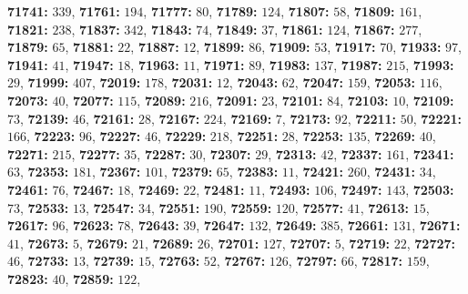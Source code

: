 \textsf{\bfseries 71741:} $339$, \textsf{\bfseries 71761:} $194$, \textsf{\bfseries 71777:} $80$, \textsf{\bfseries 71789:} $124$, \textsf{\bfseries 71807:} $58$, \textsf{\bfseries 71809:} $161$, \textsf{\bfseries 71821:} $238$, \textsf{\bfseries 71837:} $342$, \textsf{\bfseries 71843:} $74$, \textsf{\bfseries 71849:} $37$, \textsf{\bfseries 71861:} $124$, \textsf{\bfseries 71867:} $277$, \textsf{\bfseries 71879:} $65$, \textsf{\bfseries 71881:} $22$, \textsf{\bfseries 71887:} $12$, \textsf{\bfseries 71899:} $86$, \textsf{\bfseries 71909:} $53$, \textsf{\bfseries 71917:} $70$, \textsf{\bfseries 71933:} $97$, \textsf{\bfseries 71941:} $41$, \textsf{\bfseries 71947:} $18$, \textsf{\bfseries 71963:} $11$, \textsf{\bfseries 71971:} $89$, \textsf{\bfseries 71983:} $137$, \textsf{\bfseries 71987:} $215$, \textsf{\bfseries 71993:} $29$, \textsf{\bfseries 71999:} $407$, \textsf{\bfseries 72019:} $178$, \textsf{\bfseries 72031:} $12$, \textsf{\bfseries 72043:} $62$, \textsf{\bfseries 72047:} $159$, \textsf{\bfseries 72053:} $116$, \textsf{\bfseries 72073:} $40$, \textsf{\bfseries 72077:} $115$, \textsf{\bfseries 72089:} $216$, \textsf{\bfseries 72091:} $23$, \textsf{\bfseries 72101:} $84$, \textsf{\bfseries 72103:} $10$, \textsf{\bfseries 72109:} $73$, \textsf{\bfseries 72139:} $46$, \textsf{\bfseries 72161:} $28$, \textsf{\bfseries 72167:} $224$, \textsf{\bfseries 72169:} $7$, \textsf{\bfseries 72173:} $92$, \textsf{\bfseries 72211:} $50$, \textsf{\bfseries 72221:} $166$, \textsf{\bfseries 72223:} $96$, \textsf{\bfseries 72227:} $46$, \textsf{\bfseries 72229:} $218$, \textsf{\bfseries 72251:} $28$, \textsf{\bfseries 72253:} $135$, \textsf{\bfseries 72269:} $40$, \textsf{\bfseries 72271:} $215$, \textsf{\bfseries 72277:} $35$, \textsf{\bfseries 72287:} $30$, \textsf{\bfseries 72307:} $29$, \textsf{\bfseries 72313:} $42$, \textsf{\bfseries 72337:} $161$, \textsf{\bfseries 72341:} $63$, \textsf{\bfseries 72353:} $181$, \textsf{\bfseries 72367:} $101$, \textsf{\bfseries 72379:} $65$, \textsf{\bfseries 72383:} $11$, \textsf{\bfseries 72421:} $260$, \textsf{\bfseries 72431:} $34$, \textsf{\bfseries 72461:} $76$, \textsf{\bfseries 72467:} $18$, \textsf{\bfseries 72469:} $22$, \textsf{\bfseries 72481:} $11$, \textsf{\bfseries 72493:} $106$, \textsf{\bfseries 72497:} $143$, \textsf{\bfseries 72503:} $73$, \textsf{\bfseries 72533:} $13$, \textsf{\bfseries 72547:} $34$, \textsf{\bfseries 72551:} $190$, \textsf{\bfseries 72559:} $120$, \textsf{\bfseries 72577:} $41$, \textsf{\bfseries 72613:} $15$, \textsf{\bfseries 72617:} $96$, \textsf{\bfseries 72623:} $78$, \textsf{\bfseries 72643:} $39$, \textsf{\bfseries 72647:} $132$, \textsf{\bfseries 72649:} $385$, \textsf{\bfseries 72661:} $131$, \textsf{\bfseries 72671:} $41$, \textsf{\bfseries 72673:} $5$, \textsf{\bfseries 72679:} $21$, \textsf{\bfseries 72689:} $26$, \textsf{\bfseries 72701:} $127$, \textsf{\bfseries 72707:} $5$, \textsf{\bfseries 72719:} $22$, \textsf{\bfseries 72727:} $46$, \textsf{\bfseries 72733:} $13$, \textsf{\bfseries 72739:} $15$, \textsf{\bfseries 72763:} $52$, \textsf{\bfseries 72767:} $126$, \textsf{\bfseries 72797:} $66$, \textsf{\bfseries 72817:} $159$, \textsf{\bfseries 72823:} $40$, \textsf{\bfseries 72859:} $122$, 
